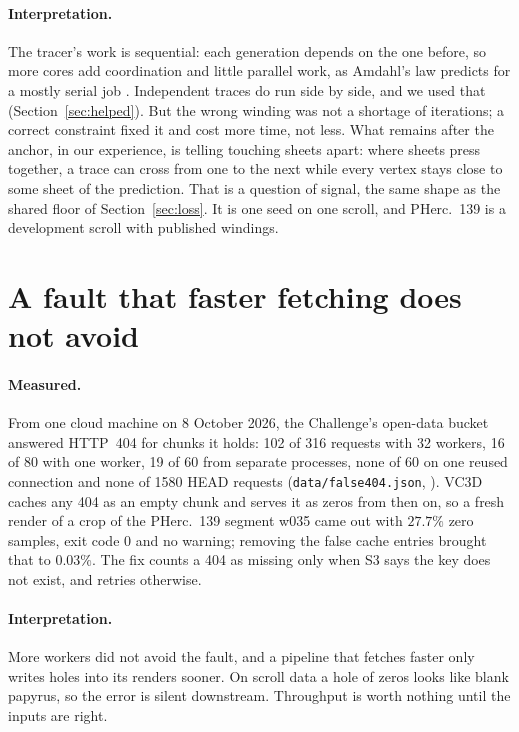 \documentclass[11pt]{article}
\begin{document}
\paragraph{Interpretation.} The tracer's work is sequential: each generation depends on the one before, so more cores add coordination and little parallel work, as Amdahl's law predicts for a mostly serial job \cite{amdahl}. Independent traces do run side by side, and we used that (Section~\ref{sec:helped}). But the wrong winding was not a shortage of iterations; a correct constraint fixed it and cost more time, not less. What remains after the anchor, in our experience, is telling touching sheets apart: where sheets press together, a trace can cross from one to the next while every vertex stays close to some sheet of the prediction. That is a question of signal, the same shape as the shared floor of Section~\ref{sec:loss}. It is one seed on one scroll, and PHerc.~139 is a development scroll with published windings.

\section{A fault that faster fetching does not avoid}\label{sec:integrity}

\paragraph{Measured.} From one cloud machine on 8 October 2026, the Challenge's open-data bucket answered HTTP~404 for chunks it holds: 102 of 316 requests with 32 workers, 16 of 80 with one worker, 19 of 60 from separate processes, none of 60 on one reused connection and none of 1580 HEAD requests (\texttt{data/false404.json}, \cite{issue2058}). VC3D caches any 404 as an empty chunk and serves it as zeros from then on, so a fresh render of a crop of the PHerc.~139 segment w035 came out with $27.7\%$ zero samples, exit code 0 and no warning; removing the false cache entries brought that to $0.03\%$. The fix \cite{pr2060} counts a 404 as missing only when S3 says the key does not exist, and retries otherwise.

\paragraph{Interpretation.} More workers did not avoid the fault, and a pipeline that fetches faster only writes holes into its renders sooner. On scroll data a hole of zeros looks like blank papyrus, so the error is silent downstream. Throughput is worth nothing until the inputs are right.
\end{document}
